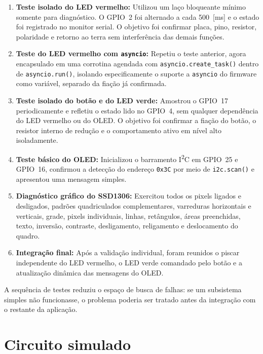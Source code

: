 \documentclass[12pt,a4paper]{article}
\begin{document}
\begin{enumerate}
  \item \textbf{Teste isolado do LED vermelho:} Utilizou um laço bloqueante mínimo somente para diagnóstico. O GPIO~2 foi alternado a cada 500~[ms] e o estado foi registrado no monitor serial. O objetivo foi confirmar placa, pino, resistor, polaridade e retorno ao terra sem interferência das demais funções.

  \item \textbf{Teste do LED vermelho com \texttt{asyncio}:} Repetiu o teste anterior, agora encapsulado em uma corrotina agendada com \texttt{asyncio.create\_task()} dentro de \texttt{asyncio.run()}, isolando especificamente o suporte a \texttt{asyncio} do firmware como variável, separado da fiação já confirmada.

  \item \textbf{Teste isolado do botão e do LED verde:} Amostrou o GPIO~17 periodicamente e refletiu o estado lido no GPIO~4, sem qualquer dependência do LED vermelho ou do OLED. O objetivo foi confirmar a fiação do botão, o resistor interno de redução e o comportamento ativo em nível alto isoladamente.

  \item \textbf{Teste básico do OLED:} Inicializou o barramento I\textsuperscript{2}C em GPIO~25 e GPIO~16, confirmou a detecção do endereço \texttt{0x3C} por meio de \texttt{i2c.scan()} e apresentou uma mensagem simples.

  \item \textbf{Diagnóstico gráfico do SSD1306:} Exercitou todos os pixels ligados e desligados, padrões quadriculados complementares, varreduras horizontais e verticais, grade, pixels individuais, linhas, retângulos, áreas preenchidas, texto, inversão, contraste, desligamento, religamento e deslocamento do quadro.

  \item \textbf{Integração final:} Após a validação individual, foram reunidos o piscar independente do LED vermelho, o LED verde comandado pelo botão e a atualização dinâmica das mensagens do OLED.
\end{enumerate}

A sequência de testes reduziu o espaço de busca de falhas: se um subsistema simples não funcionasse, o problema poderia ser tratado antes da integração com o restante da aplicação.

\section{Circuito simulado}
\end{document}
